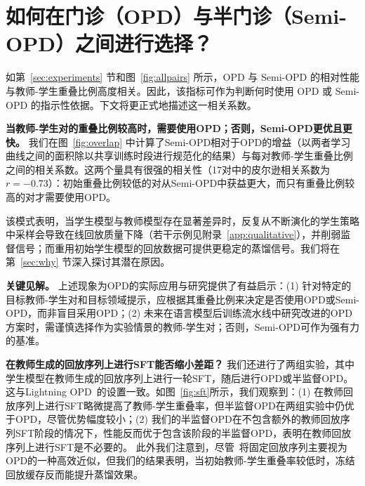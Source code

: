 
\vspace{-0.5em}
\section{如何在门诊（OPD）与半门诊（Semi-OPD）之间进行选择？}
\vspace{-0.5em}
\label{sec:when_why}

如第~\ref{sec:experiments} 节和图~\ref{fig:allpairs} 所示，OPD 与 Semi-OPD 的相对性能与教师-学生重叠比例高度相关。因此，该指标可作为判断何时使用 OPD 或 Semi-OPD 的指示性依据。下文将更正式地描述这一相关系数。

\noindent \textbf{当教师-学生对的重叠比例较高时，需要使用OPD；否则，Semi-OPD更优且更快。} 我们在图~\ref{fig:overlap} 中计算了Semi-OPD相对于OPD的增益（以两者学习曲线之间的面积除以共享训练时段进行规范化的结果）与每对教师-学生重叠比例之间的相关系数。这两个量具有很强的相关性（17对中的皮尔逊相关系数为$r=-0.73$）：初始重叠比例较低的对从Semi-OPD中获益更大，而只有重叠比例较高的对才需要使用OPD。

该模式表明，当学生模型与教师模型存在显著差异时，反复从不断演化的学生策略中采样会导致在线回放质量下降（若干示例见附录~\ref{app:qualitative}），并削弱监督信号；而重用初始学生模型的回放数据可提供更稳定的蒸馏信号。我们将在第~\ref{sec:why} 节深入探讨其潜在原因。



\textbf{关键见解。}
上述现象为OPD的实际应用与研究提供了有益启示：(1) 针对特定的目标教师-学生对和目标领域提示，应根据其重叠比例来决定是否使用OPD或Semi-OPD，而非盲目采用OPD；(2) 未来在语言模型后训练流水线中研究改进的OPD方案时，需谨慎选择作为实验情景的教师-学生对；否则，Semi-OPD可作为强有力的基准。



\textbf{在教师生成的回放序列上进行SFT能否缩小差距？}
我们还进行了两组实验，其中学生模型在教师生成的回放序列上进行一轮SFT，随后进行OPD或半监督OPD。这与Lightning OPD~\citep{wu2026lightning}的设置一致。如图~\ref{fig:sft}所示，我们观察到：(1) 在教师回放序列上进行SFT略微提高了教师-学生重叠率，但半监督OPD在两组实验中仍优于OPD，尽管优势幅度较小；(2) 我们的半监督OPD在不包含额外的教师回放序列SFT阶段的情况下，性能反而优于包含该阶段的半监督OPD，表明在教师回放序列上进行SFT是不必要的。
此外我们注意到，尽管~\citep{wu2026lightning}将固定回放序列主要视为OPD的一种高效近似，但我们的结果表明，当初始教师-学生重叠率较低时，冻结回放缓存反而能提升蒸馏效果。


